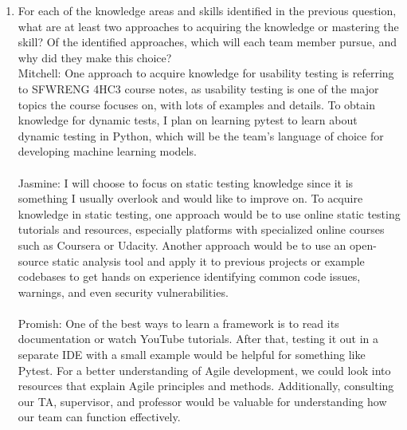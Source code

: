 \documentclass[12pt, titlepage]{article}
\begin{document}
\begin{enumerate}
  \item For each of the knowledge areas and skills identified in the previous
  question, what are at least two approaches to acquiring the knowledge or
  mastering the skill?  Of the identified approaches, which will each team
  member pursue, and why did they make this choice?\\
  \newline
  \hspace{2em} Mitchell: One approach to acquire knowledge for usability testing is referring to SFWRENG 4HC3 course notes,
  as usability testing is one of the major topics the course focuses on, with lots of examples and details. To obtain knowledge for dynamic tests, I plan on learning pytest to learn about dynamic testing in Python, which will be the
  team's language of choice for developing machine learning models.\\\\
  \hspace{2em} Jasmine: I will choose to focus on static testing knowledge since it is something I usually overlook 
  and would like to improve on. To acquire knowledge in static testing, one approach would be to use online static 
  testing tutorials and resources, especially platforms with specialized online courses such as Coursera or Udacity. 
  Another approach would be to use an open-source static analysis tool and apply it to previous projects or example 
  codebases to get hands on experience identifying common code issues, warnings, and even security vulnerabilities.\\\\
  \hspace{2em} Promish: One of the best ways to learn a framework is to read its 
  documentation or watch YouTube tutorials. After that, testing it out in a separate IDE 
  with a small example would be helpful for something like Pytest. For a better 
  understanding of Agile development, we could look into resources that explain Agile 
  principles and methods. Additionally, consulting our TA, supervisor, and professor 
  would be valuable for understanding how our team can function effectively.\\\\

\end{enumerate}
\end{document}
